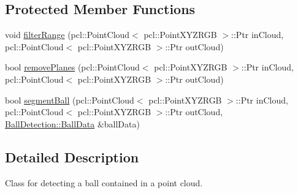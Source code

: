 \subsection*{\-Protected \-Member \-Functions}
\begin{DoxyCompactItemize}
\item 
void \hyperlink{classBallDetection_a7da699c0edd8d370b4fd8706d3c2b197}{filter\-Range} (pcl\-::\-Point\-Cloud$<$ pcl\-::\-Point\-X\-Y\-Z\-R\-G\-B $>$\-::\-Ptr in\-Cloud, pcl\-::\-Point\-Cloud$<$ pcl\-::\-Point\-X\-Y\-Z\-R\-G\-B $>$\-::\-Ptr out\-Cloud)
\item 
bool \hyperlink{classBallDetection_a6a3b7bb225e15eb2ad7e2db16d1f7692}{remove\-Planes} (pcl\-::\-Point\-Cloud$<$ pcl\-::\-Point\-X\-Y\-Z\-R\-G\-B $>$\-::\-Ptr in\-Cloud, pcl\-::\-Point\-Cloud$<$ pcl\-::\-Point\-X\-Y\-Z\-R\-G\-B $>$\-::\-Ptr out\-Cloud)
\item 
bool \hyperlink{classBallDetection_a4712a4606665043af81fcda001b19393}{segment\-Ball} (pcl\-::\-Point\-Cloud$<$ pcl\-::\-Point\-X\-Y\-Z\-R\-G\-B $>$\-::\-Ptr in\-Cloud, pcl\-::\-Point\-Cloud$<$ pcl\-::\-Point\-X\-Y\-Z\-R\-G\-B $>$\-::\-Ptr out\-Cloud, \hyperlink{structBallDetection_1_1BallData}{\-Ball\-Detection\-::\-Ball\-Data} \&ball\-Data)
\end{DoxyCompactItemize}


\subsection{\-Detailed \-Description}
\-Class for detecting a ball contained in a point cloud. 

